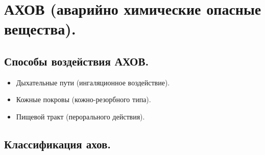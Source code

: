 \documentclass[12pt]{article}
\begin{document}
	\section{АХОВ (аварийно химические опасные вещества).}
	
	\subsection{Способы воздействия АХОВ.}
	
	\begin{itemize}
		\item Дыхательные пути (ингаляционное воздействие).
		\item Кожные покровы (кожно-резорбного типа).
		\item Пищевой тракт (перорального действия).
	\end{itemize}
	
	\subsection{Классификация ахов.}
	
\end{document}
